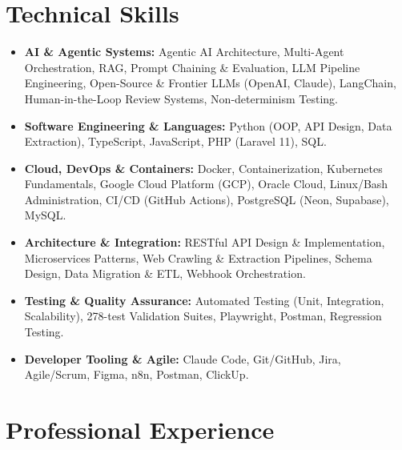 \documentclass[10pt,a4paper]{article}
\begin{document}
\section*{Technical Skills}
\begin{itemize}
    \item \textbf{AI \& Agentic Systems:} Agentic AI Architecture, Multi-Agent Orchestration, RAG, Prompt Chaining \& Evaluation, LLM Pipeline Engineering, Open-Source \& Frontier LLMs (OpenAI, Claude), LangChain, Human-in-the-Loop Review Systems, Non-determinism Testing.
    \item \textbf{Software Engineering \& Languages:} Python (OOP, API Design, Data Extraction), TypeScript, JavaScript, PHP (Laravel 11), SQL.
    \item \textbf{Cloud, DevOps \& Containers:} Docker, Containerization, Kubernetes Fundamentals, Google Cloud Platform (GCP), Oracle Cloud, Linux/Bash Administration, CI/CD (GitHub Actions), PostgreSQL (Neon, Supabase), MySQL.
    \item \textbf{Architecture \& Integration:} RESTful API Design \& Implementation, Microservices Patterns, Web Crawling \& Extraction Pipelines, Schema Design, Data Migration \& ETL, Webhook Orchestration.
    \item \textbf{Testing \& Quality Assurance:} Automated Testing (Unit, Integration, Scalability), 278-test Validation Suites, Playwright, Postman, Regression Testing.
    \item \textbf{Developer Tooling \& Agile:} Claude Code, Git/GitHub, Jira, Agile/Scrum, Figma, n8n, Postman, ClickUp.
\end{itemize}

\section*{Professional Experience}
\end{document}
